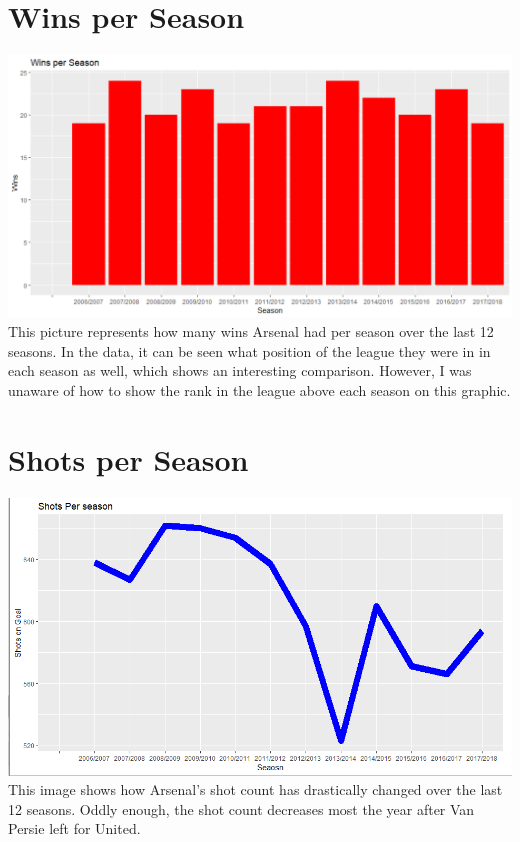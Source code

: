 \documentclass{article}
\begin{document}
\section{Wins per Season}
\includegraphics[width=\textwidth]{PS6b_Richardson}
This picture represents how many wins Arsenal had per season over the last 12 seasons. In the data, it can be seen what position of the league they were in in each season as well, which shows an interesting comparison. However, I was unaware of how to show the rank in the league above each season on this graphic.

\section{Shots per Season}
\includegraphics[width=\textwidth]{PS6c_Richardson}
This image shows how Arsenal's shot count has drastically changed over the last 12 seasons. Oddly enough, the shot count decreases most the year after Van Persie left for United.
\end{document}
